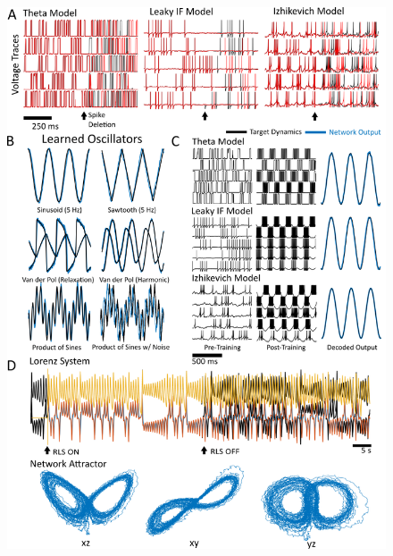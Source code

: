 \documentclass[11pt]{article} %
\begin{document}
\begin{figure}[htp!]
\centering
\includegraphics[scale=0.9]{FFIG2}
\caption{}\label{FORCE2}
\end{figure}
 
\end{document}
